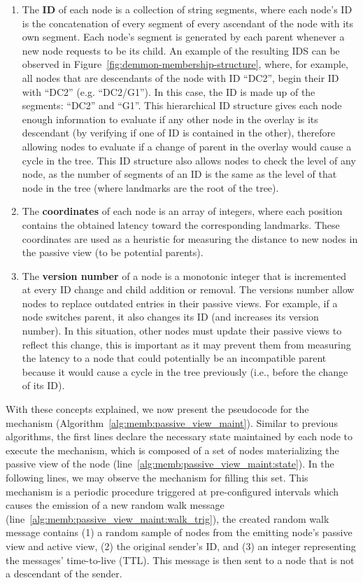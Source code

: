 \begin{enumerate}
    \item The \textbf{ID} of each node is a collection of string segments, where each node's ID is the concatenation of every segment of every ascendant of the node with its own segment. Each node's segment is generated by each parent whenever a new node requests to be its child. An example of the resulting IDS can be observed in Figure~\ref{fig:demmon-membership-structure}, where, for example, all nodes that are descendants of the node with ID ``DC2'', begin their ID with ``DC2'' (e.g. ``DC2/G1''). In this case, the ID is made up of the segments: ``DC2'' and ``G1''. This hierarchical ID structure gives each node enough information to evaluate if any other node in the overlay is its descendant (by verifying if one of ID is contained in the other), therefore allowing nodes to evaluate if a change of parent in the overlay would cause a cycle in the tree. This ID structure also allows nodes to check the level of any node, as the number of segments of an ID is the same as the level of that node in the tree (where landmarks are the root of the tree).
    
    \item The \textbf{coordinates} of each node is an array of integers, where each position contains the obtained latency toward the corresponding landmarks. These coordinates are used as a heuristic for measuring the distance to new nodes in the passive view (to be potential parents).
    
    \item The \textbf{version number} of a node is a monotonic integer that is incremented at every ID change and child addition or removal. The versions number allow nodes to replace outdated entries in their passive views. For example, if a node switches parent, it also changes its ID (and increases its version number). In this situation, other nodes must update their passive views to reflect this change, this is important as it may prevent them from measuring the latency to a node that could potentially be an incompatible parent because it would cause a cycle in the tree previously (i.e., before the change of its ID).
\end{enumerate}

With these concepts explained, we now present the pseudocode for the mechanism (Algorithm~\ref{alg:memb:passive_view_maint}). Similar to previous algorithms, the first lines declare the necessary state maintained by each node to execute the mechanism, which is composed of a set of nodes materializing the passive view of the node (line~\ref{alg:memb:passive_view_maint:state}). In the following lines, we may observe the mechanism for filling this set. This mechanism is a periodic procedure triggered at pre-configured intervals which causes the emission of a new random walk message (line~\ref{alg:memb:passive_view_maint:walk_trig}), the created random walk message contains (1) a random sample of nodes from the emitting node's passive view and active view, (2) the original sender's ID, and (3) an integer representing the messages' time-to-live (TTL). This message is then sent to a node that is not a descendant of the sender.

